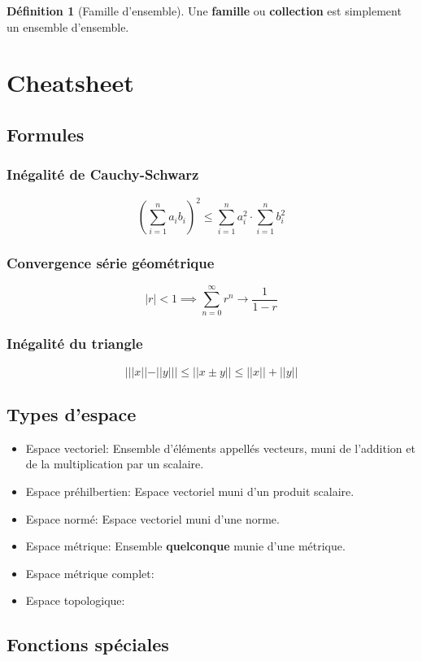 \documentclass[12pt]{book}
\newcommand\todo[1]{\phantom{#1}}
\theoremstyle{definition}
\newtheorem{definition}{Définition}[section]
\begin{document}
\begin{definition}[Famille d'ensemble]
    \label{def:famille}
    Une \textbf{famille} ou \textbf{collection} est simplement un ensemble d'ensemble.
\end{definition}
\todo{Add reference}

\chapter{Cheatsheet}
\section{Formules}
\subsection{Inégalité de Cauchy-Schwarz}
$$(\sum_{i=1}^{n} a_ib_i)^2 \leq \sum_{i=1}^{n} a_i^2 \cdot \sum_{i=1}^{n} b_i ^ 2$$ 
\subsection{Convergence série géométrique}
$$|r| < 1 \implies \sum_{n=0}^{\infty} r^n \to \frac{1}{1 - r} $$
\subsection{Inégalité du triangle}
$$| ||x|| - ||y|| | \leq ||x \pm y|| \leq ||x|| + ||y|| $$
\section{Types d'espace}
\begin{itemize}
    \item Espace vectoriel: Ensemble d'éléments appellés vecteurs, muni de l'addition et de la multiplication par un scalaire.
    \item Espace préhilbertien: Espace vectoriel muni d'un produit scalaire.
    \item Espace normé: Espace vectoriel muni d'une norme.
    \item Espace métrique: Ensemble \textbf{quelconque} munie d'une métrique.
    \item Espace métrique complet:
    \item Espace topologique:
\end{itemize}
\section{Fonctions spéciales}
\end{document}
